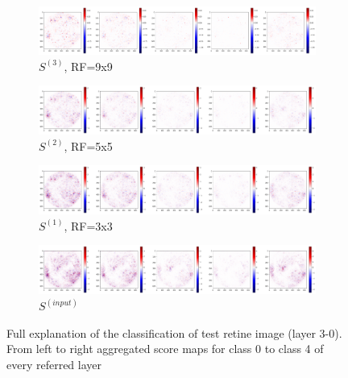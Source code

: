 \documentclass[preprint]{elsarticle}
\theoremstyle{definition} %
\theoremstyle{remark}
\begin{document}
\begin{figure}[h!]
	\centering
	\begin{subfigure}[b]{\textwidth}
		\includegraphics[width=\textwidth]{figures/score-prop-23713_left/score_rf9.png}
		\caption{$S^{(3)}$, RF=9x9}
		\label{fig:score_rf9}
	\end{subfigure}

	\begin{subfigure}[b]{\textwidth}
		\includegraphics[width=\textwidth]{figures/score-prop-23713_left/score_rf5.png}
		\caption{$S^{(2)}$, RF=5x5}
		\label{fig:score_rf5}
	\end{subfigure}
	
	\begin{subfigure}[b]{\textwidth}
		\includegraphics[width=\textwidth]{figures/score-prop-23713_left/score_rf3.png}
		\caption{$S^{(1)}$, RF=3x3}
		\label{fig:score_rf3}
	\end{subfigure}
	
	\begin{subfigure}[b]{\textwidth}
		\includegraphics[width=\textwidth]{figures/score-prop-23713_left/score_input.png}
		\caption{$S^{(input)}$}
		\label{fig:score_input}
	\end{subfigure}

	\caption{Full explanation of the classification of test retine image (layer 3-0). From left to right aggregated score maps for class 0 to class 4 of every referred layer}
	\label{fig:test1_score_explanation3_rf}
\end{figure}
\end{document}
